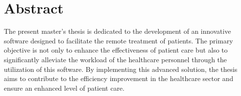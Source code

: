 \section*{Abstract}

The present master's thesis is dedicated to the
 development of an innovative software designed to 
facilitate the remote treatment of patients. The primary
objective is not only to enhance the effectiveness of patient
care but also to significantly alleviate the workload of the healthcare
personnel through the utilization of this software. By implementing this 
advanced solution, the thesis aims to contribute to the efficiency improvement 
in the healthcare sector and ensure an enhanced level of patient care.



